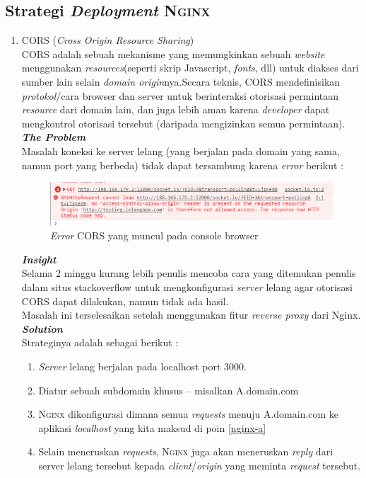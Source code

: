 \subsection{Strategi \textit{Deployment} \textsc{Nginx}}

\begin{enumerate}
	\item CORS (\textit{Cross Origin Resource Sharing})
	\\
	CORS adalah sebuah mekanisme yang memungkinkan  sebuah \textit{website} menggunakan \textit{resources}(seperti skrip Javascript, \textit{fonts}, dll) untuk diakses dari sumber lain selain \textit{domain origin}nya.Secara teknis, CORS mendefinisikan \textit{protokol}/cara browser dan server untuk berinteraksi otorisasi permintaan \textit{resource} dari domain lain, dan juga lebih aman karena \textit{developer} dapat mengkontrol otorisasi tersebut (daripada mengizinkan semua permintaan).\\
	
	\textbf{\textit{The Problem}} \\
	Masalah koneksi ke server lelang (yang berjalan pada domain yang sama, namun port yang berbeda) tidak dapat tersambung karena \textit{error} berikut :


	\begin{figure}[H]
		\centering
		\includegraphics[width=\textwidth]{images/bab4/pl/madafaka_cors.png}
		\caption{\textit{Error} CORS yang muncul pada console browser}
		\label{cors}
	\end{figure}
	
	
	\textbf{\textit{Insight}} \\
	Selama 2 minggu kurang lebih penulis mencoba cara yang ditemukan penulis dalam situs stackoverflow untuk mengkonfigurasi \textit{server} lelang agar otorisasi CORS dapat dilakukan, namun tidak ada hasil.\\
	\indent Masalah ini terselesaikan setelah menggunakan fitur \textit{reverse proxy} dari Nginx.\\
	
	\textbf{\textit{Solution}} \\
	\indentenum Strateginya adalah sebagai berikut :
	\begin{enumerate}
		\item \label{nginx-a} \textit{Server} lelang berjalan pada localhost port 3000.
		\item \label{nginx-b} Diatur sebuah subdomain khusus -- misalkan A.domain.com
		\item \textsc{Nginx} dikonfigurasi dimana semua \textit{requests} menuju A.domain.com ke aplikasi \textit{localhost} yang kita maksud di poin \ref{nginx-a}
		\item Selain meneruskan \textit{requests}, \textsc{Nginx} juga akan meneruskan \textit{reply} dari server lelang tersebut kepada \textit{client}/\textit{origin} yang meminta \textit{request} tersebut.				
	\end{enumerate}
\end{enumerate}